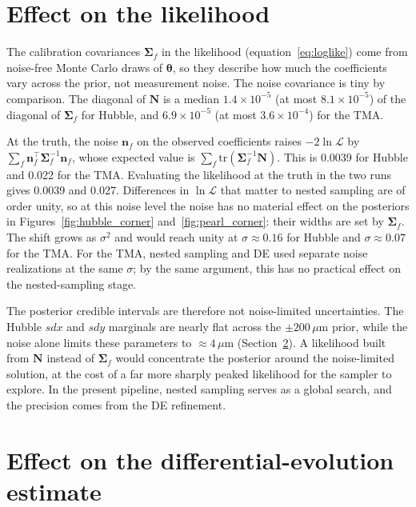 \section{Effect on the likelihood}\label{sec:noise_likelihood}

The calibration covariances $\boldsymbol{\Sigma}_f$ in the likelihood (equation~\ref{eq:loglike}) come from noise-free Monte Carlo draws of $\boldsymbol{\theta}$, so they describe how much the coefficients vary across the prior, not measurement noise. The noise covariance is tiny by comparison. The diagonal of $\mathbf{N}$ is a median $1.4\times10^{-5}$ (at most $8.1\times10^{-5}$) of the diagonal of $\boldsymbol{\Sigma}_f$ for Hubble, and $6.9\times10^{-5}$ (at most $3.6\times10^{-4}$) for the TMA.

At the truth, the noise $\mathbf{n}_f$ on the observed coefficients raises $-2\ln\mathcal{L}$ by $\sum_f \mathbf{n}_f^{\top}\boldsymbol{\Sigma}_f^{-1}\mathbf{n}_f$, whose expected value is $\sum_f \mathrm{tr}(\boldsymbol{\Sigma}_f^{-1}\mathbf{N})$. This is 0.0039 for Hubble and 0.022 for the TMA. Evaluating the likelihood at the truth in the two runs gives 0.0039 and 0.027. Differences in $\ln\mathcal{L}$ that matter to nested sampling are of order unity, so at this noise level the noise has no material effect on the posteriors in Figures~\ref{fig:hubble_corner} and~\ref{fig:pearl_corner}: their widths are set by $\boldsymbol{\Sigma}_f$. The shift grows as $\sigma^2$ and would reach unity at $\sigma\approx0.16$ for Hubble and $\sigma\approx0.07$ for the TMA. For the TMA, nested sampling and DE used separate noise realizations at the same $\sigma$; by the same argument, this has no practical effect on the nested-sampling stage.

The posterior credible intervals are therefore not noise-limited uncertainties. The Hubble $sdx$ and $sdy$ marginals are nearly flat across the $\pm200\,\mu\mathrm{m}$ prior, while the noise alone limits these parameters to $\approx 4\,\mu\mathrm{m}$ (Section~\ref{sec:noise_de}). A likelihood built from $\mathbf{N}$ instead of $\boldsymbol{\Sigma}_f$ would concentrate the posterior around the noise-limited solution, at the cost of a far more sharply peaked likelihood for the sampler to explore. In the present pipeline, nested sampling serves as a global search, and the precision comes from the DE refinement.

\section{Effect on the differential-evolution estimate}\label{sec:noise_de}

